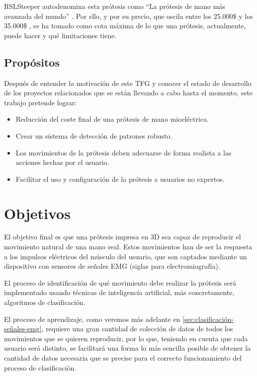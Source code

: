 RSLSteeper autodenomina esta prótesis como ``La prótesis de mano más avanzada
del mundo'' \cite{bebionicWeb}. Por ello, y por su precio, que oscila entre
los 25.000\$ y los 35.000\$ \cite{bebionicPrice}, se ha tomado como cota
máxima
de lo que una prótesis, actualmente, puede hacer y qué limitaciones tiene.



\subsection{Propósitos}
\label{sub:propósitos}

Después de entender la motivación de este TFG y conocer el estado de desarrollo de los proyectos
relacionados que se están llevando a cabo hasta el momento, este trabajo pretende lograr:

\begin{itemize}
  \item Reducción del coste final de una prótesis de mano mioeléctrica.
  \item Crear un sistema de detección de patrones robusto.
  \item Los movimientos de la prótesis deben adecuarse de forma realista a las
  acciones hechas por el usuario.
  \item Facilitar el uso y configuración de la prótesis a usuarios no expertos.
\end{itemize}


\section{Objetivos}
\label{sec:objetivos}


El objetivo final es que una prótesis impresa en 3D sea capaz de reproducir
el movimiento natural de una mano real. Estos movimientos han de ser la respuesta a los impulsos
eléctricos del músculo del usuario, que son captados mediante un dispositivo
con sensores de señales EMG (siglas para electromiografía).

El proceso de identificación de qué movimiento debe realizar la prótesis será
implementado usando técnicas de inteligencia artificial, más concretamente,
algoritmos de clasificación.

El proceso de aprendizaje, como veremos más adelante en \ref{sec:clasificación-señales-emg},
requiere una gran cantidad de colección de datos de todos los movimientos que se quieren
reproducir, por lo que, teniendo en cuenta que cada usuario será distinto, se facilitará una
forma lo más sencilla posible de obtener la cantidad de datos necesaria que
se precise para el correcto funcionamiento del proceso de clasificación.

